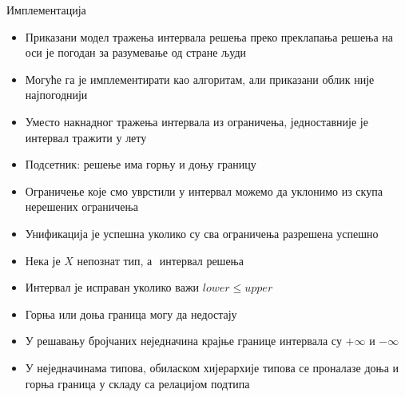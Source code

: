 \documentclass[xcolor=table]{beamer}
\begin{document}
    \begin{frame}[allowframebreaks]{Имплементација}
        \begin{itemize}
            \item Приказани модел тражења интервала решења преко преклапања решења на оси је погодан за разумевање од стране људи
            \item Могуће га је имплементирати као алгоритам, али приказани облик није најпогоднији
            \item Уместо накнадног тражења интервала из ограничења, једноставније је интервал тражити у лету
            \item Подсетник: решење има горњу и доњу границу
            \item Ограничење које смо уврстили у интервал можемо да уклонимо из скупа нерешених ограничења
            \item Унификација је успешна уколико су сва ограничења разрешена успешно
        \end{itemize}
        
        \framebreak
        
        \begin{itemize}
            \item Нека је \begin{math}X\end{math} непознат тип, а \begin{math}[lower, upper]\end{math} интервал решења
            \item Интервал је исправан уколико важи \begin{math}lower \leq upper\end{math}
            \item Горња или доња граница могу да недостају
            \item У решавању бројчаних неједначина крајње границе интервала су \begin{math}+\infty\end{math} и \begin{math}-\infty\end{math}
            \item У неједначинама типова, обиласком хијерархије типова се проналазе доња и горња граница у складу са релацијом подтипа
        \end{itemize}
        
        \framebreak
        

\end{frame}
\end{document}
